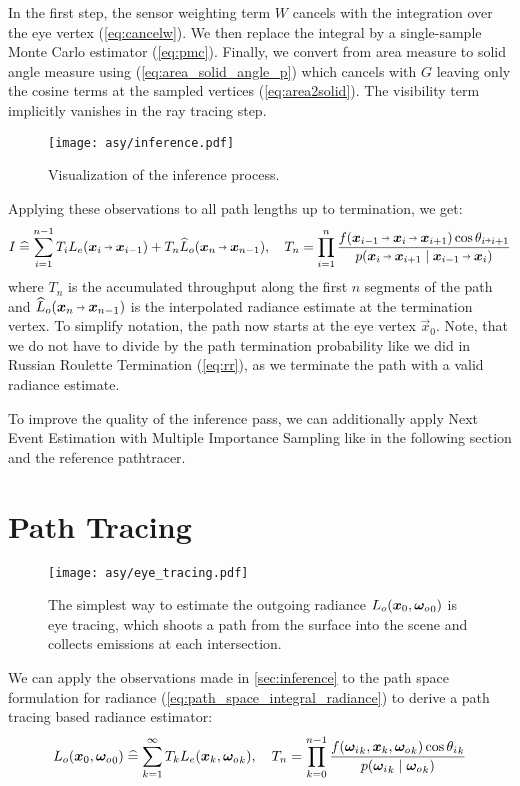 In the first step, the sensor weighting term $W$ cancels with the integration over the eye vertex (\cref{eq:cancelw}).
We then replace the integral by a single-sample Monte Carlo estimator (\cref{eq:pmc}).
Finally, we convert from area measure to solid angle measure using (\cref{eq:area_solid_angle_p}) which cancels with $G$ leaving only the cosine terms at the sampled vertices (\cref{eq:area2solid}).
The visibility term implicitly vanishes in the ray tracing step.
\begin{figure}[ht]
    \centering
    \texttt{[image: asy/inference.pdf]}
\caption{Visualization of the inference process.}
\label{fig:inference}
\end{figure}

Applying these observations to all path lengths up to termination, we get:
\begin{equation}
\label{eq:inference}
    I
    \hateq \sum_{i=1}^{n-1} T_i L_e(\pdir{i}{i-1}) + T_n \widehat{L}_o(\pdir{n}{n-1}), \quad
    T_n
    = \prod_{i=1}^{n} \frac{f(\ptrip{i-1}{i}{i+1}) \cos \theta_{i \veryshortarrow i+1}}{p(\pdir{i}{i+1} \mid \pdir{i-1}{i})}
\end{equation}
where $T_n$ is the accumulated throughput along the first $n$ segments of the path and $\widehat{L}_o(\pdir{n}{n-1})$ is the interpolated radiance estimate at the termination vertex.
To simplify notation, the path now starts at the eye vertex $\vec{x}_0$.
Note, that we do not have to divide by the path termination probability like we did in Russian Roulette Termination (\cref{eq:rr}), as we terminate the path with a valid radiance estimate.

To improve the quality of the inference pass, we can additionally apply Next Event Estimation with Multiple Importance Sampling like in the following section and the reference pathtracer.

\section{Path Tracing}
\label{sec:re_eye}
\begin{figure}[ht]
    \centering
    \texttt{[image: asy/eye\_tracing.pdf]}
\caption{The simplest way to estimate the outgoing radiance $L_o(\bm{x}_0, {\bm{\omega}_o}_0)$ is eye tracing, which shoots a path from the surface into the scene and collects emissions at each intersection.}
\label{fig:eye_tracing}
\end{figure}
We can apply the observations made in \cref{sec:inference} to the path space formulation for radiance (\cref{eq:path_space_integral_radiance}) to derive a path tracing based radiance estimator:
\begin{equation}
    L_o(\bm{x}_0, {\bm{\omega}_o}_0)
    \mathrel{\widehat{=}} \sum_{k=1}^{\infty} T_k L_e(\bm{x}_k, {\bm{\omega}_o}_k), \quad
    T_n
    = \prod_{k=0}^{n-1} \frac{f({\bm{\omega}_i}_k, \bm{x}_k, {\bm{\omega}_o}_k) \cos {\theta_i}_k}{p({\bm{\omega}_i}_k \mid {\bm{\omega}_o}_k)}
\end{equation}

